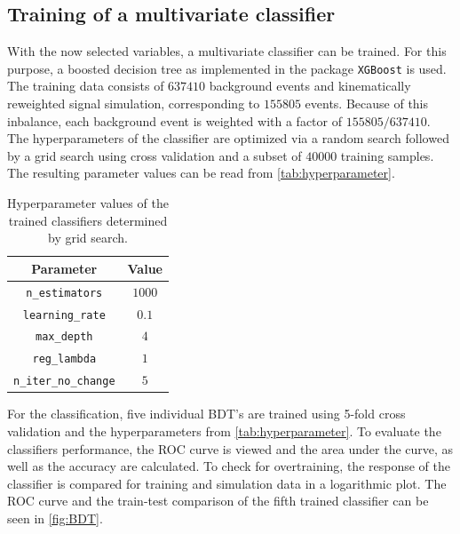 \subsection{Training of a multivariate classifier}
With the now selected variables, a multivariate classifier can be trained. For this purpose, a boosted decision tree as implemented in the package \texttt{XGBoost} \cite{XGBoost}
is used. The training data consists of $\num{637410}$ background events and kinematically reweighted signal simulation, corresponding to $\num{155805}$ events. Because of this 
inbalance, each background event is weighted with a factor of $155805/637410$.
The hyperparameters of the classifier are optimized via a random search followed by a grid search using cross validation and a subset of $\num{40000}$ training samples. 
The resulting parameter values can be read from \autoref{tab:hyperparameter}.
\begin{table}[h!]
  \centering
  \caption{Hyperparameter values of the trained classifiers determined by grid search.}
  \label{tab:hyperparameter}
  \begin{tabular}{c | c}
    \hline
    {Parameter} & {Value} \\
    \hline
    \texttt{n\_estimators} & {$\num{1000}$} \\
    \texttt{learning\_rate} & {$\num{0.1}$} \\
    \texttt{max\_depth} & {$\num{4}$} \\
    \texttt{reg\_lambda} & {$\num{1}$} \\
    \texttt{n\_iter\_no\_change} & {$\num{5}$} \\
    \hline   
  \end{tabular}
\end{table}
For the classification, five individual BDT's are trained using 5-fold cross validation and the hyperparameters from \autoref{tab:hyperparameter}.
To evaluate the classifiers performance, the ROC curve is viewed and the area under the curve, as well as the accuracy are calculated. 
To check for overtraining, the response of the classifier is compared for training and simulation data in a logarithmic plot.
The ROC curve and the train-test comparison of the fifth trained classifier can be seen in \autoref{fig:BDT}.
